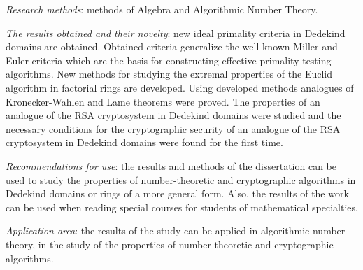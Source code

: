 \documentclass[_00_autoref.tex]{subfiles}
\begin{document}
\textit{Research methods}:
methods of Algebra and Algorithmic Number Theory.

\textit{The results obtained and their novelty}:
new ideal primality criteria in Dedekind domains are obtained.
Obtained criteria generalize the well-known Miller and Euler criteria which are the basis for constructing effective primality testing algorithms.
New methods for studying the extremal properties of the Euclid algorithm in factorial rings are developed.
Using developed methods analogues of Kronecker-Wahlen and Lame theorems were proved.
The properties of an analogue of the RSA cryptosystem in Dedekind domains were studied and the necessary conditions for the cryptographic security of an analogue of the RSA cryptosystem in Dedekind domains were found for the first time.

\textit{Recommendations for use}:
the results and methods of the dissertation can be used to study the properties of number-theoretic and cryptographic algorithms in Dedekind domains or rings of a more general form.
Also, the results of the work can be used when reading special courses for students of mathematical specialties.

\textit{Application area}:
the results of the study can be applied in algorithmic number theory, in the study of the properties of number-theoretic and cryptographic algorithms.
\end{document}
